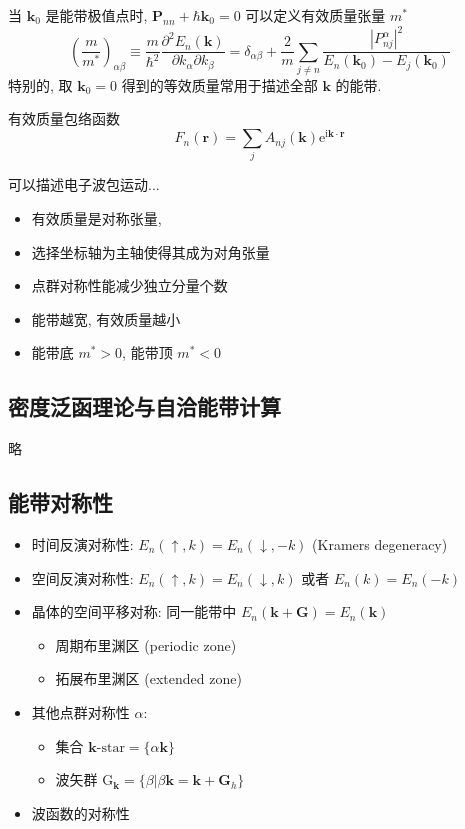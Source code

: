 \documentclass[11pt,a4paper]{article}%
\numberwithin{equation}{section}%
\renewcommand*{\vec}[1]{\bm{#1}}%
\newcommand\mi{\mathrm{i}}
\newcommand\e{\mathrm{e}}%
\begin{document}
当 $\vec k_0$ 是能带极值点时, $\vec P_{nn} + \hbar\vec k_0 = 0$ %
可以定义有效质量张量 $m^*$
\begin{equation}
	\left(\frac{m}{m^*}\right)_{\alpha\beta}\equiv \frac{m}{\hbar^2}\frac{\partial^2 E_n(\vec k)}{\partial k_\alpha\partial k_\beta} 
	= \delta_{\alpha\beta} + \frac 2m\sum_{j\neq n}\frac{\left|P^\alpha_{nj}\right|^2}{E_n(\vec k_0) - E_j(\vec k_0)}
\end{equation}
特别的, 取 $\vec k_0 = 0$ 得到的等效质量常用于描述全部 $\vec k$ 的能带.

有效质量包络函数
\begin{equation}
	F_n(\vec r) = \sum_j A_{nj}(\vec k)\e^{\mi\vec k\cdot\vec r}
\end{equation}

可以描述电子波包运动...
\begin{itemize}
	\item 有效质量是对称张量,
	\item 选择坐标轴为主轴使得其成为对角张量
	\item 点群对称性能减少独立分量个数
	\item 能带越宽, 有效质量越小
	\item 能带底 $m^*>0$, 能带顶 $m^*<0$
\end{itemize}
\subsection{密度泛函理论与自洽能带计算} %
\label{sub:density_func}
略
\subsection{能带对称性} %
\label{sub:band_sym}
\begin{itemize}
	\item 时间反演对称性: $E_n(\uparrow,k) = E_n(\downarrow,-k)$ (Kramers degeneracy)
	\item 空间反演对称性: $E_n(\uparrow, k) = E_n(\downarrow,k)$ 或者 $E_n(k) = E_n(-k)$
	\item 晶体的空间平移对称: 同一能带中 $E_n(\vec k + \vec G) = E_n(\vec k)$
	\begin{itemize}
		\item 周期布里渊区 (periodic zone)
		\item 拓展布里渊区 (extended zone)
	\end{itemize}
	\item 其他点群对称性 $\alpha$: 
	\begin{itemize}
		\item 集合 $\vec k\mbox{-star} = \{\alpha\vec k\}$
		\item 波矢群 $\mathrm{G}_{\vec k} = \{\beta|\beta\vec k = \vec k + \vec G_h\}$
	\end{itemize}
	\item 波函数的对称性
\end{itemize}
\end{document}

